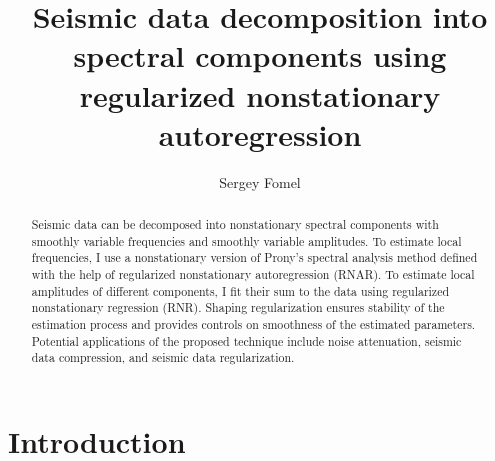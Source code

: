 
\title{Seismic data decomposition into spectral components using regularized nonstationary autoregression}

\author{Sergey Fomel}

\address{
Bureau of Economic Geology, \\
John A. and Katherine G. Jackson School of Geosciences \\
The University of Texas at Austin \\
University Station, Box X \\
Austin, TX 78713-8924 \\
sergey.fomel@beg.utexas.edu}


\maketitle


\begin{abstract}
  Seismic data can be decomposed into nonstationary spectral
  components with smoothly variable frequencies and smoothly variable
  amplitudes. To estimate local frequencies, I use a nonstationary
  version of Prony's spectral analysis method defined with the help of
  regularized nonstationary autoregression (RNAR). To estimate local
  amplitudes of different components, I fit their sum to the data
  using regularized nonstationary regression (RNR). Shaping
  regularization ensures stability of the estimation process and
  provides controls on smoothness of the estimated
  parameters. Potential applications of the proposed technique
  include noise attenuation, seismic data compression, and seismic
  data regularization.
\end{abstract}

\section{Introduction}

